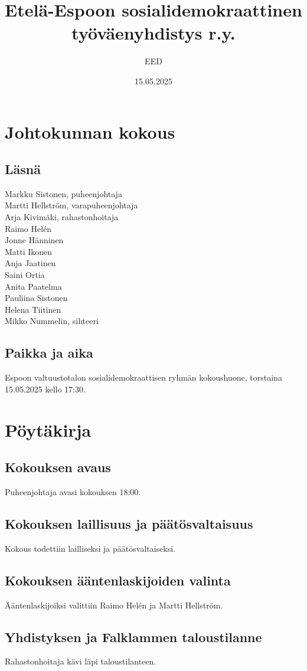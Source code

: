 \documentclass[a4paper,12pt]{article}
\title{Etelä-Espoon sosialidemokraattinen työväenyhdistys r.y.}
\author{EED}
\date{15.05.2025}
\begin{document}
\maketitle
\tableofcontents
\section*{Johtokunnan kokous}
\subsection*{Läsnä}
Markku Sistonen, puheenjohtaja \\
Martti Hellström, varapuheenjohtaja \\
Arja Kivimäki, rahastonhoitaja \\
Raimo Helén \\
Jonne Hänninen \\
Matti Ikonen \\
Anja Jaatinen \\
Saini Ortia \\
Anita Paatelma \\
Pauliina Sistonen \\
Helena Tiitinen \\
Mikko Nummelin, sihteeri
\subsection*{Paikka ja aika}
Espoon valtuustotalon sosialidemokraattisen ryhmän kokoushuone, torstaina 15.05.2025 kello 17:30.
\section*{Pöytäkirja}
\subsection{Kokouksen avaus}
Puheenjohtaja avasi kokouksen 18:00.
\subsection{Kokouksen laillisuus ja päätösvaltaisuus}
Kokous todettiin lailliseksi ja päätösvaltaiseksi.
\subsection{Kokouksen ääntenlaskijoiden valinta}
Ääntenlaskijoiksi valittiin Raimo Helén ja Martti Hellström.
\subsection{Yhdistyksen ja Falklammen taloustilanne}
Rahastonhoitaja kävi läpi taloustilanteen.
\end{document}
